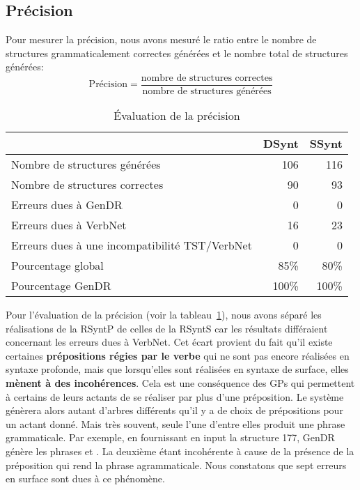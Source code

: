 \subsection{Précision}\label{sec:precision}
Pour mesurer la précision, nous avons mesuré le ratio entre le nombre de structures grammaticalement correctes générées et le nombre total de structures générées:
\[\text{Précision} = \frac{\text{nombre de structures correctes}}{\text{nombre de structures générées}}\]

\begin{table}
\caption{Évaluation de la précision}
\label{fig:evaluationprecision}
\begin{tabular}{lrr}
 \toprule
  & DSynt & SSynt\\
 \midrule
 Nombre de structures générées   & 106  & 116 \\
 Nombre de structures correctes  &  90  & 93   \\
 Erreurs dues à GenDR & 0 & 0\\
 Erreurs dues à VerbNet    & 16 & 23\\
 Erreurs dues à une incompatibilité TST/VerbNet & 0 & 0\\
 \midrule
 Pourcentage global & 85\%  & 80\% \\
 Pourcentage GenDR & 100\%  & 100\% \\
 \bottomrule
\end{tabular}
\end{table}

Pour l'évaluation de la précision (voir la tableau~\ref{fig:evaluationprecision}), nous avons séparé les réalisations de la \ac{RSyntP} de celles de la \ac{RSyntS} car les résultats différaient concernant les erreurs dues à VerbNet. Cet écart provient du fait qu'il existe certaines \textbf{prépositions régies par le verbe} qui ne sont pas encore réalisées en syntaxe profonde, mais que lorsqu'elles sont réalisées en syntaxe de surface, elles \textbf{mènent à des incohérences}. Cela est une conséquence des \acp{GP} qui permettent à certains de leurs actants de se réaliser par plus d'une préposition. Le système génèrera alors autant d'arbres différents qu'il y a de choix de prépositions pour un actant donné. Mais très souvent, seule l'une d'entre elles produit une phrase grammaticale. Par exemple, en fournissant en input la structure 177, GenDR génère les phrases  et \ungr{}. La deuxième étant incohérente à cause de la présence de la préposition  qui rend la phrase agrammaticale. Nous constatons que sept erreurs en surface sont dues à ce phénomène.

